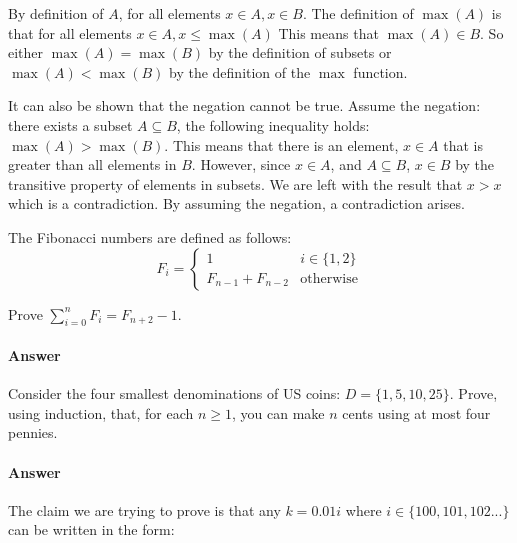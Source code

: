 \documentclass{article}
\begin{document}
By definition of $A$, for all elements $x \in A, x\in B$. The definition of $\max(A)$ is that for all elements $x \in A, x \leq \max(A)$
This means that $\max(A) \in B$. So either $\max(A) = \max(B)$ by the definition of subsets or $ \max(A) < \max(B)$ by the definition of the $\max$ function.

It can also be shown that the negation cannot be true. Assume the negation: there exists a subset  $A \subseteq B$, the following inequality
holds: $\max(A) > \max(B)$. This means that there is an element, $x \in A$ that is greater than all elements in $B$. However, since $x \in A$,
 and $A \subseteq B$, $x \in B$ by the transitive property of elements in subsets. We are left with the result that $x>x$ which is a contradiction. 
 By assuming the negation, a contradiction arises.

\collab{\todo{}} 

The Fibonacci numbers are defined as follows:
$$
    F_i = \begin{cases}
            1 & i \in \{1,2\} \\
            F_{n-1}+F_{n-2} & \text{otherwise}
          \end{cases}
$$

Prove $\sum_{i=0}^n F_i = F_{n+2}-1$.

\paragraph{Answer}


 

Consider the four smallest denominations of US coins: $D=\{1,5,10,25\}$.  Prove, using
induction, that, for each $n \geq 1$, you can make $n$ cents using at most four
pennies.

\paragraph{Answer}
The claim we are trying to prove is that any $k = 0.01i$ where $i \in \{100, 101, 102...\}$ can be written in the form:
\end{document}
